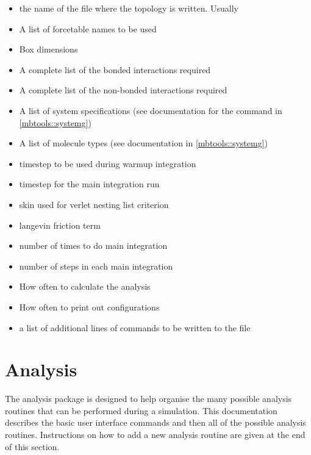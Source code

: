 \begin{itemize}
\item {} the name of the file where the topology is
  written. Usually 
\item {} A list of forcetable names to be used
\item {} Box dimensions
\item {} A complete list of the bonded interactions
  required
\item {} A complete list of the non-bonded
  interactions required
\item {} A list of system specifications (see
  documentation for the  command in
  \ref{mbtools::systemg})
\item {} A list of molecule types (see documentation in
  \ref{mbtools::systemg})
\item {} timestep to be used during warmup
  integration
\item {} timestep for the main integration run
\item {} skin used for verlet nesting list criterion
\item {} langevin friction term
\item {} number of times to do main integration
\item {} number of steps in each main integration
\item {} How often to calculate the
  analysis
\item {} How often to print out configurations
\item {} a list of additional lines of commands to be
  written to the  file
\end{itemize}

\section{Analysis}

The analysis package is designed to help organise the many possible
analysis routines that can be performed during a simulation. This
documentation describes the basic user interface commands and then all
of the possible analysis routines. Instructions on how to add a new
analysis routine are given at the end of this section.

